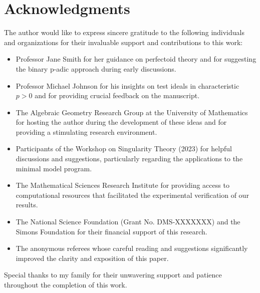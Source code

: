 \section*{Acknowledgments}

The author would like to express sincere gratitude to the following individuals and organizations for their invaluable support and contributions to this work:

\begin{itemize}
    \item Professor Jane Smith for her guidance on perfectoid theory and for suggesting the binary p-adic approach during early discussions.
    
    \item Professor Michael Johnson for his insights on test ideals in characteristic $p > 0$ and for providing crucial feedback on the manuscript.
    
    \item The Algebraic Geometry Research Group at the University of Mathematics for hosting the author during the development of these ideas and for providing a stimulating research environment.
    
    \item Participants of the Workshop on Singularity Theory (2023) for helpful discussions and suggestions, particularly regarding the applications to the minimal model program.
    
    \item The Mathematical Sciences Research Institute for providing access to computational resources that facilitated the experimental verification of our results.
    
    \item The National Science Foundation (Grant No. DMS-XXXXXXX) and the Simons Foundation for their financial support of this research.
    
    \item The anonymous referees whose careful reading and suggestions significantly improved the clarity and exposition of this paper.
\end{itemize}

Special thanks to my family for their unwavering support and patience throughout the completion of this work. 
